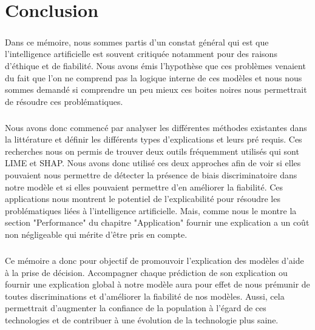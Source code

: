 \chapter{Conclusion}

\paragraph{}Dans ce mémoire, nous sommes partis d'un constat général qui est que l'intelligence artificielle est souvent critiquée notamment pour des raisons d'éthique et de fiabilité. Nous avons émis l'hypothèse que ces problèmes venaient du fait que l'on ne comprend pas la logique interne de ces modèles et nous nous sommes demandé si comprendre un peu mieux ces boites noires nous permettrait de résoudre ces problématiques.

\paragraph{}Nous avons donc commencé par analyser les différentes méthodes existantes dans la littérature et définir les différents types d'explications et leurs pré requis. Ces recherches nous on permis de trouver deux outils fréquemment utilisés qui sont LIME et SHAP. Nous avons donc utilisé ces deux approches afin de voir si elles pouvaient nous permettre de détecter la présence de biais discriminatoire dans notre modèle et si elles pouvaient permettre d'en améliorer la fiabilité. Ces applications nous montrent le potentiel de l'explicabilité pour résoudre les problématiques liées à l'intelligence artificielle. Mais, comme nous le montre la section "Performance" du chapitre "Application" fournir une explication a un coût non négligeable qui mérite d'être pris en compte.

\paragraph{}Ce mémoire a donc pour objectif de promouvoir l'explication des modèles d'aide à la prise de décision. Accompagner chaque prédiction de son explication ou fournir une explication global à notre modèle aura pour effet de nous prémunir de toutes discriminations et d'améliorer la fiabilité de nos modèles. Aussi, cela permettrait d’augmenter la confiance de la population à l’égard de ces technologies et de contribuer à une évolution de la technologie plus saine.